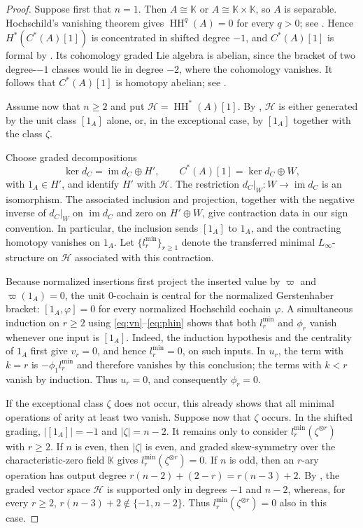 \documentclass[11pt,a4paper,reqno]{amsart}
\newcommand{\mK}{\mathbb K}
\newcommand{\HH}{\operatorname{HH}}
\theoremstyle{plain}
\theoremstyle{definition}
\numberwithin{equation}{section}
\begin{document}
	\begin{proof}
		Suppose first that $n=1$.  Then $A\cong\mK$ or
		$A\cong\mK\times\mK$, so $A$ is separable.  Hochschild's vanishing theorem
		gives $\HH^q(A)=0$ for every $q>0$; see
		\cite[Theorem~4.1]{Hoc45}.  Hence $H^*(C^*(A)[1])$ is concentrated in shifted
		degree $-1$, and $C^*(A)[1]$ is formal by
		\cite[Example~6.2.3]{Man22}.  Its cohomology graded Lie algebra is abelian,
		since the bracket of two degree-$-1$ classes would lie in degree $-2$, where
		the cohomology vanishes.  It follows that $C^*(A)[1]$ is homotopy abelian;
		see \cite[Definitions~6.2.1--6.2.2]{Man22}.
		
		Assume now that $n\geq2$ and put $\mathcal H=\HH^*(A)[1]$.  By
		, $\mathcal H$ is either generated by
		the unit class $[1_A]$ alone, or, in the exceptional case, by
		$[1_A]$ together with the class $\zeta$.
		
		Choose graded decompositions
		\[
		\ker d_C=\operatorname{im}d_C\oplus H',
		\qquad
		C^*(A)[1]=\ker d_C\oplus W,
		\]
		with $1_A\in H'$, and identify $H'$ with $\mathcal H$.  The restriction
		$d_C|_W:W\to\operatorname{im}d_C$ is an isomorphism.  The associated
		inclusion and projection, together with the negative inverse of $d_C|_W$ on
		$\operatorname{im}d_C$ and zero on $H'\oplus W$, give contraction data in
		our sign convention.  In particular, the inclusion sends $[1_A]$ to
		$1_A$, and the contracting homotopy vanishes on $1_A$. Let
		$\{l_r^{\min}\}_{r\geq1}$ denote the transferred minimal
		$L_\infty$-structure on $\mathcal H$ associated with this contraction.
		
		Because normalized insertions first project the inserted value by $\varpi$
		and $\varpi(1_A)=0$, the unit $0$-cochain is central for the normalized
		Gerstenhaber bracket: $[1_A,\varphi]=0$ for every normalized Hochschild
		cochain $\varphi$. 
		A simultaneous induction on $r\geq2$ using
		\eqref{eq:vn}--\eqref{eq:phin} shows that both $l_r^{\min}$ and
		$\phi_r$ vanish whenever one input is $[1_A]$.
		Indeed, the induction hypothesis and the centrality of $1_A$
		first give $v_r=0$, and hence $l_r^{\min}=0$, on such inputs.
		In $u_r$, the term with $k=r$ is $-\phi_1l_r^{\min}$ and
		therefore vanishes by this conclusion; the terms with $k<r$
		vanish by induction. Thus $u_r=0$, and consequently $\phi_r=0$.
		
		If the exceptional class $\zeta$ does not occur, this already shows that all
		minimal operations of arity at least two vanish.  Suppose now that $\zeta$
		occurs.  In the shifted grading, $|[1_A]|=-1$ and $|\zeta|=n-2$.
		It remains only to consider
		$l_r^{\min}(\zeta^{\otimes r})$ with $r\geq2$.
		If $n$ is even, then $|\zeta|$ is even, and graded skew-symmetry over the
		characteristic-zero field $\mK$ gives $l_r^{\min}(\zeta^{\otimes r})=0$.
		If $n$ is odd, then an $r$-ary operation has output degree $r(n-2)+(2-r)=r(n-3)+2$.
		By , the graded vector space $\mathcal H$
		is supported only in degrees $-1$ and $n-2$, whereas, for every $r\geq2$,
		$r(n-3)+2\notin\{-1,n-2\}$.
		Thus $l_r^{\min}(\zeta^{\otimes r})=0$ also in this case.
		

\end{proof}
\end{document}
